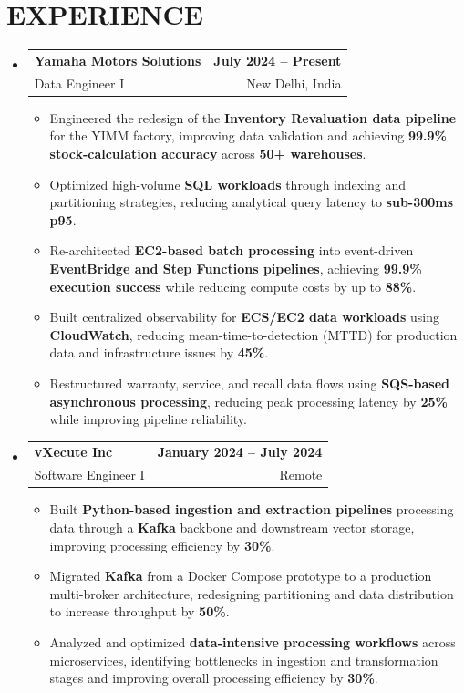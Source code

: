 \documentclass[letterpaper,10pt]{article}
\makeatletter
\renewcommand{\normalsize}{%
  \fontsize{10.1}{12.25}\selectfont
}
\newcommand{\resumeItem}[1]{
  \item\normalsize{
    {#1}
  }
}
\newcommand{\resumeSubheading}[4]{
  \item
    \begin{tabular*}{1.0\textwidth}[t]{l@{\extracolsep{\fill}}r}
      \textbf{\normalsize#1} & \textbf{\normalsize#2} \\
      {\normalsize#3} & {\normalsize#4} \\
    \end{tabular*}\vspace{1pt}
}
\newcommand{\resumeSubHeadingListStart}{\begin{itemize}[leftmargin=0.0in, label={}, itemsep=4pt, topsep=2pt]}
\newcommand{\resumeSubHeadingListEnd}{\end{itemize}}
\newcommand{\resumeItemListStart}{\begin{itemize}}
\newcommand{\resumeItemListEnd}{\end{itemize}\vspace{-3pt}}
\makeatother
\begin{document}
\section{EXPERIENCE}
  \resumeSubHeadingListStart

    \resumeSubheading
      {Yamaha Motors Solutions}{July 2024 -- Present}
      {Data Engineer I}{New Delhi, India}
      \resumeItemListStart
        \resumeItem{Engineered the redesign of the \textbf{Inventory Revaluation data pipeline} for the YIMM factory, improving data validation and achieving \textbf{99.9\% stock-calculation accuracy} across \textbf{50+ warehouses}.}
        \resumeItem{Optimized high-volume \textbf{SQL workloads} through indexing and partitioning strategies, reducing analytical query latency to \textbf{sub-300ms p95}.}
        \resumeItem{Re-architected \textbf{EC2-based batch processing} into event-driven \textbf{EventBridge and Step Functions pipelines}, achieving \textbf{99.9\% execution success} while reducing compute costs by up to \textbf{88\%}.}
        \resumeItem{Built centralized observability for \textbf{ECS/EC2 data workloads} using \textbf{CloudWatch}, reducing mean-time-to-detection (MTTD) for production data and infrastructure issues by \textbf{45\%}.}
        \resumeItem{Restructured warranty, service, and recall data flows using \textbf{SQS-based asynchronous processing}, reducing peak processing latency by \textbf{25\%} while improving pipeline reliability.}
      \resumeItemListEnd

    \resumeSubheading
      {vXecute Inc}{January 2024 -- July 2024}
      {Software Engineer I}{Remote}
      \resumeItemListStart
        \resumeItem{Built \textbf{Python-based ingestion and extraction pipelines} processing data through a \textbf{Kafka} backbone and downstream vector storage, improving processing efficiency by \textbf{30\%}.}
        \resumeItem{Migrated \textbf{Kafka} from a Docker Compose prototype to a production multi-broker architecture, redesigning partitioning and data distribution to increase throughput by \textbf{50\%}.}
        \resumeItem{Analyzed and optimized \textbf{data-intensive processing workflows} across microservices, identifying bottlenecks in ingestion and transformation stages and improving overall processing efficiency by \textbf{30\%}.}
      \resumeItemListEnd

  \resumeSubHeadingListEnd

\end{document}
